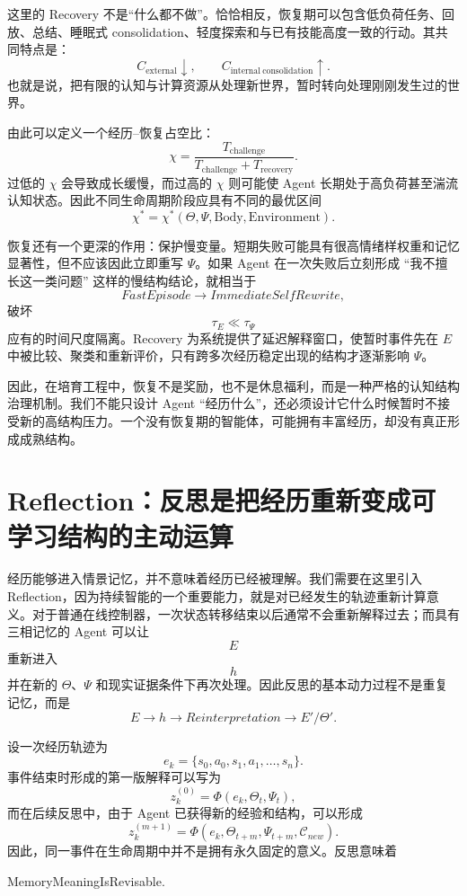 这里的 Recovery 不是“什么都不做”。恰恰相反，恢复期可以包含低负荷任务、回放、总结、睡眠式 consolidation、轻度探索和与已有技能高度一致的行动。其共同特点是：
\[
C_{\mathrm{external}}
\downarrow,
\qquad
C_{\mathrm{internal\ consolidation}}
\uparrow.
\]
也就是说，把有限的认知与计算资源从处理新世界，暂时转向处理刚刚发生过的世界。

由此可以定义一个经历--恢复占空比：
\[
\chi
=
\frac{T_{\mathrm{challenge}}}
{T_{\mathrm{challenge}}+T_{\mathrm{recovery}}}.
\]
过低的 $\chi$ 会导致成长缓慢，而过高的 $\chi$ 则可能使 Agent 长期处于高负荷甚至湍流认知状态。因此不同生命周期阶段应具有不同的最优区间
\[
\chi^\ast
=
\chi^\ast
(\Theta,\Psi,\mathrm{Body},\mathrm{Environment}).
\]

恢复还有一个更深的作用：保护慢变量。短期失败可能具有很高情绪样权重和记忆显著性，但不应该因此立即重写 $\Psi$。如果 Agent 在一次失败后立刻形成
“我不擅长这一类问题”
这样的慢结构结论，就相当于
\[
FastEpisode
\rightarrow
ImmediateSelfRewrite,
\]
破坏
\[
\tau_E
\ll
\tau_\Psi
\]
应有的时间尺度隔离。Recovery 为系统提供了延迟解释窗口，使暂时事件先在 $E$ 中被比较、聚类和重新评价，只有跨多次经历稳定出现的结构才逐渐影响 $\Psi$。

因此，在培育工程中，恢复不是奖励，也不是休息福利，而是一种严格的认知结构治理机制。我们不能只设计 Agent “经历什么”，还必须设计它什么时候暂时不接受新的高结构压力。一个没有恢复期的智能体，可能拥有丰富经历，却没有真正形成成熟结构。

\section{Reflection：反思是把经历重新变成可学习结构的主动运算}

经历能够进入情景记忆，并不意味着经历已经被理解。我们需要在这里引入 Reflection，因为持续智能的一个重要能力，就是对已经发生的轨迹重新计算意义。对于普通在线控制器，一次状态转移结束以后通常不会重新解释过去；而具有三相记忆的 Agent 可以让
\[
E
\]
重新进入
\[
h
\]
并在新的 $\Theta$、$\Psi$ 和现实证据条件下再次处理。因此反思的基本动力过程不是重复记忆，而是
\[
\boxed{
E
\rightarrow
h
\rightarrow
Reinterpretation
\rightarrow
E'/\Theta'.
}
\]

设一次经历轨迹为
\[
e_k=
\{s_0,a_0,s_1,a_1,\ldots,s_n\}.
\]
事件结束时形成的第一版解释可以写为
\[
z_k^{(0)}
=
\Phi
(e_k,\Theta_t,\Psi_t),
\]
而在后续反思中，由于 Agent 已获得新的经验和结构，可以形成
\[
z_k^{(m+1)}
=
\Phi
\left(
e_k,
\Theta_{t+m},
\Psi_{t+m},
\mathcal C_{new}
\right).
\]
因此，同一事件在生命周期中并不是拥有永久固定的意义。反思意味着
\begin{statementbox}
MemoryMeaningIsRevisable.
\end{statementbox}

